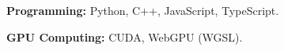 \textbf{Programming:} Python, C++, JavaScript, TypeScript.\par
\textbf{GPU Computing:} CUDA, WebGPU (WGSL).\par
